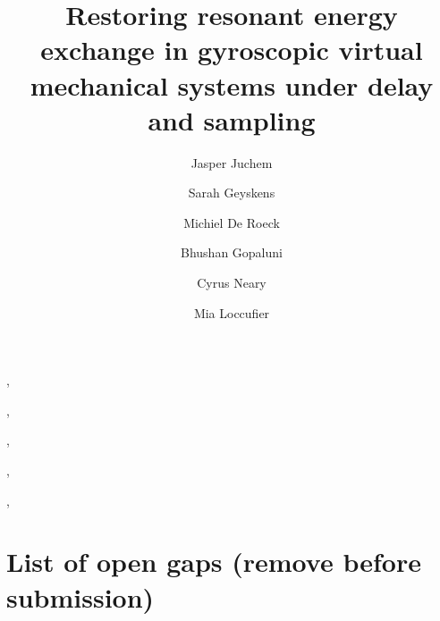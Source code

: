 \documentclass[twocolumn]{autart}\def\USEAUTART{1}%
\begin{document}
\begin{frontmatter}

\title{Restoring resonant energy exchange in gyroscopic virtual mechanical
systems under delay and sampling}


\author[ECE]{Jasper Juchem},
\author[UGent]{Sarah Geyskens},
\author[UGent]{Michiel De Roeck},
\author[CBE]{Bhushan Gopaluni},
\author[ECE]{Cyrus Neary},
\author[UGent]{Mia Loccufier}

\address[ECE]{Department of Electrical \& Computer Engineering, University of
British Columbia, Vancouver, BC, Canada}
\address[CBE]{Department of Chemical \& Biological Engineering, University of
British Columbia, Vancouver, BC, Canada}
\address[UGent]{Department of Electromechanical, Systems and Metal Engineering,
Ghent University, Ghent, Belgium}



\end{frontmatter}












\appendix


\ifdefined\SHOWGAPS
\onecolumn
\section*{List of open gaps (remove before submission)}
\listofgaps
\fi
\end{document}
